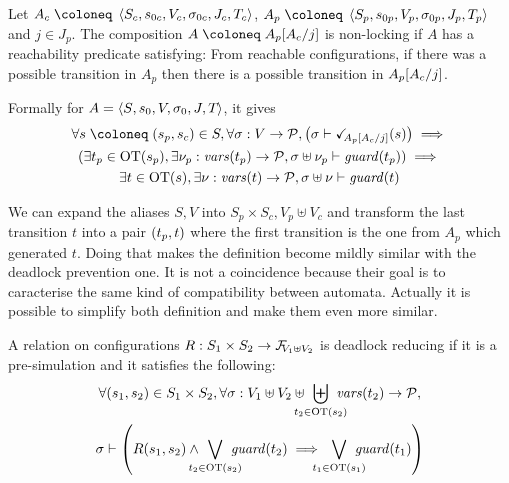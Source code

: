 \documentclass{article}
\begin{document}
\begin{defi}
Let \(A_c \defobject \OAg[c]\), \(A_p \defobject \OAg[p]\) and \(j \in J_p\).
The composition \(A \defobject A_p\subst{A_c}{j}\) is non-locking if \(A\) has a reachability predicate satisfying:
From reachable configurations, if there was a possible transition in \(A_p\) then there is a possible transition in \(A_p\subst{A_c}{j}\).

Formally for \(A = \OAg\), it gives
\begin{multline*}
	\forall s \defobject \mpar{s_p, s_c} \in S, \forall \sigma: V \to \values, \mpar{\sigma \vdash \reach{A_p\subst{A_c}{j}}\mpar{s}} \implies \\
	\mpar{\exists t_p \in \fOT{s_p}, \exists \nu_p: \fvars{t_p} \to \values, \sigma \uplus \nu_p \vdash \fguard{t_p}} \implies \\
	\exists t \in \fOT{s}, \exists \nu: \fvars{t} \to \values, \sigma \uplus \nu \vdash \fguard{t}
\end{multline*}
\end{defi}
We can expand the aliases \(S, V\) into \(S_p \times S_c, V_p \uplus V_c\) and transform the last transition \(t\) into a pair \(\mpar{t_p, t}\) where the first transition is the one from \(A_p\) which generated \(t\).
Doing that makes the definition become mildly similar with the deadlock prevention one. %
It is not a coincidence because their goal is to caracterise the same kind of compatibility between automata.
Actually it is possible to simplify both definition and make them even more similar.
\begin{defi}
A relation on configurations \(R: S_1 \times S_2 \to \rformulas[V_1 \uplus V_2]\) is deadlock reducing if it is a pre-simulation and it satisfies the following:
\begin{multline*}
	\forall \mpar{s_1, s_2} \in S_1 \times S_2, \forall \sigma: V_1 \uplus V_2 \uplus \biguplus_\subbox{t_2 \in \fOT{s_2}} \fvars{t_2} \to \values, \\
	\sigma \vdash \mpar{R\mpar{s_1, s_2} \wedge \bigvee_\subbox{t_2 \in \fOT{s_2}} \fguard{t_2} \implies \bigvee_\subbox{t_1 \in \fOT{s_1}} \fguard{t_1}}
\end{multline*}
\end{defi}
\end{document}
